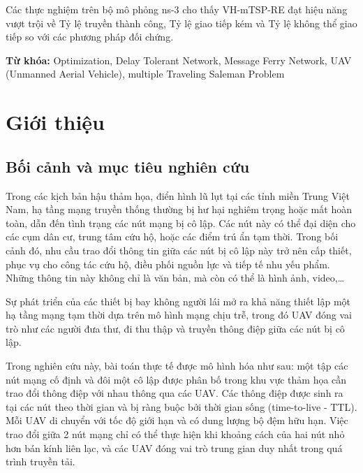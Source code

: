 \documentclass[a4paper]{article}
\begin{document}
Các thực nghiệm trên bộ mô phỏng ns-3 cho thấy VH-mTSP-RE đạt hiệu năng vượt trội về Tỷ lệ truyền thành công, Tỷ lệ giao tiếp kém và Tỷ lệ không thể giao tiếp so với các phương pháp đối chứng.

{\bfseries Từ khóa:} Optimization, Delay Tolerant Network, Message Ferry Network, UAV (Unmanned Aerial Vehicle), multiple Traveling Saleman Problem


\newpage
\begingroup
\centering
\tableofcontents
\endgroup

\newpage
\listoftables
\newpage
\listoffigures
\newpage
\listofalgorithms
\newpage

\newpage

\section{Giới thiệu}
\subsection{Bối cảnh và mục tiêu nghiên cứu}
Trong các kịch bản hậu thảm họa, điển hình lũ lụt tại các tỉnh miền Trung Việt Nam, hạ tầng mạng truyền thống thường bị hư hại nghiêm trọng hoặc mất hoàn toàn, dẫn đến tình trạng các nút mạng bị cô lập. 
Các nút này có thể đại diện cho các cụm dân cư, trung tâm cứu hộ, hoặc các điểm trú ẩn tạm thời. Trong bối cảnh đó, nhu cầu trao đổi thông tin giữa các nút bị cô lập này trở nên cấp thiết, phục vụ cho công tác cứu hộ, điều phối nguồn lực và tiếp tế nhu yếu phẩm. 
Những thông tin này không chỉ là văn bản, mà còn có thể là hình ảnh, video,\dots

Sự phát triển của các thiết bị bay không người lái mở ra khả năng thiết lập một hạ tầng mạng tạm thời dựa trên mô hình mạng chịu trễ, trong đó UAV đóng vai trò như các người đưa thư, đi thu thập và truyền thông điệp giữa các nút bị cô lập.

Trong nghiên cứu này, bài toán thực tế được mô hình hóa như sau: một tập các nút mạng cố định và đôi một cô lập được phân bố trong khu vực thảm họa cần trao đổi thông điệp với nhau thông qua các UAV. Các thông điệp được sinh ra tại các nút theo thời gian và bị ràng buộc bởi thời gian sống (time-to-live - TTL).
Mỗi UAV di chuyển với tốc độ giới hạn và có dung lượng bộ đệm hữu hạn. Việc trao đổi giữa 2 nút mạng chỉ có thể thực hiện khi khoảng cách của hai nút nhỏ hơn bán kính liên lạc, và các UAV đóng vai trò trung gian duy nhất trong quá trình truyền tải.
\end{document}
